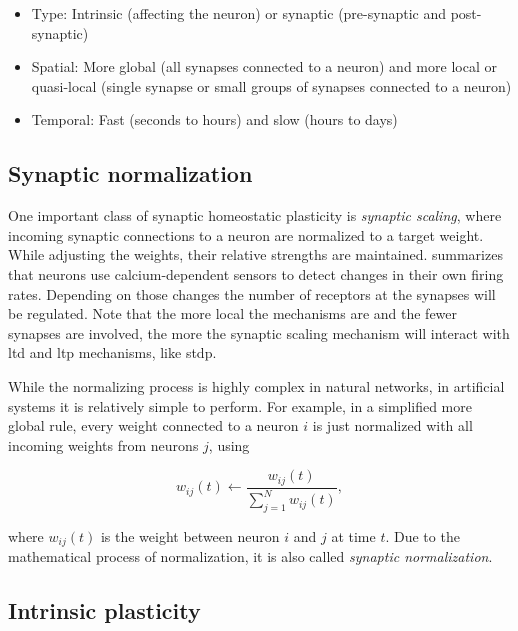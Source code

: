 \begin{itemize}
\item Type: Intrinsic (affecting the neuron) or synaptic (pre-synaptic and post-synaptic)
\item Spatial: More global (all synapses connected to a neuron) and more local or quasi-local (single synapse or small groups of synapses connected to a neuron)
\item Temporal: Fast (seconds to hours) and slow (hours to days)
\end{itemize}

\subsection{Synaptic normalization}
\label{sec:synaptic-scaling}

One important class of synaptic homeostatic plasticity is \emph{synaptic scaling}, where incoming synaptic connections to a neuron are normalized to a target weight. While adjusting the weights, their relative strengths are maintained. \textcite{turrigiano2008self} summarizes that neurons use calcium-dependent sensors to detect changes in their own firing rates. Depending on those changes the number of receptors at the synapses will be regulated. Note that the more local the mechanisms are and the fewer synapses are involved, the more the synaptic scaling mechanism will interact with \ac{ltd} and \ac{ltp} mechanisms, like \ac{stdp}.

While the normalizing process is highly complex in natural networks, in artificial systems it is relatively simple to perform. For example, in a simplified more global rule, every weight connected to a neuron $i$ is just normalized with all incoming weights from neurons $j$, using

\begin{equation}
\label{eq:sn}
w_{ij}(t) \leftarrow \frac{w_{ij}(t)}{\sum_{j=1}^N w_{ij}(t)},
\end{equation}


where $w_{ij}(t)$ is the weight between neuron $i$ and $j$ at time $t$. Due to the mathematical process of normalization, it is also called \emph{synaptic normalization}.

\subsection{Intrinsic plasticity}
\label{sec:ip}

